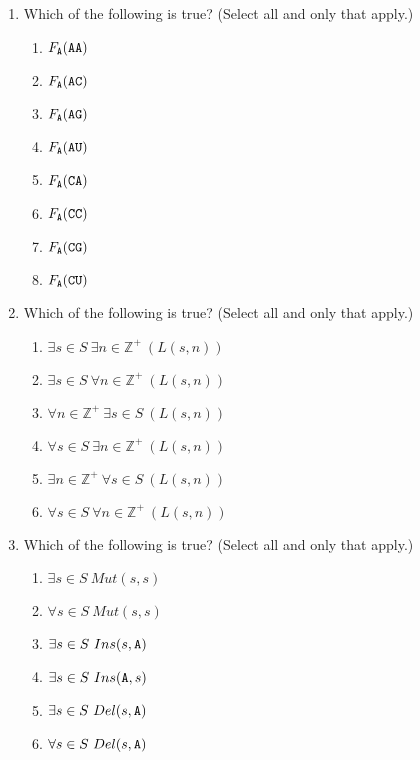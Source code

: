 \documentclass[12pt, oneside]{article}
\begin{document}
\begin{enumerate}
\begin{enumerate}
\item Which of the following is true? (Select  all and only that apply.)
 \begin{enumerate}
    \item $F_{\texttt{A}} ( \texttt{A}\texttt{A})$
    \item $F_{\texttt{A}} ( \texttt{A}\texttt{C})$
    \item $F_{\texttt{A}} ( \texttt{A}\texttt{G})$
    \item $F_{\texttt{A}} ( \texttt{A}\texttt{U})$
    \item $F_{\texttt{A}} ( \texttt{C}\texttt{A})$
    \item $F_{\texttt{A}} ( \texttt{C}\texttt{C})$
    \item $F_{\texttt{A}} ( \texttt{C}\texttt{G})$
    \item $F_{\texttt{A}} ( \texttt{C}\texttt{U})$
 \end{enumerate}    
\item Which of the following is true? (Select  all and only that apply.)
 \begin{enumerate}
    \item $\exists s \in S ~\exists n \in \mathbb{Z}^+ ~(L(s,n))$
    \item $\exists s \in S ~\forall n \in \mathbb{Z}^+ ~(L(s,n))$
    \item $\forall n \in \mathbb{Z}^+~\exists s \in S ~(L(s,n))$
    \item $\forall s \in S ~\exists n \in \mathbb{Z}^+ ~(L(s,n))$
    \item $\exists n \in \mathbb{Z}^+ ~\forall s \in S ~(L(s,n))$
    \item $\forall s \in S ~\forall n \in \mathbb{Z}^+ ~(L(s,n))$
 \end{enumerate} 
\item Which of the following is true? (Select  all and only that apply.)
 \begin{enumerate}
    \item $\exists s \in S ~Mut(s,s)$
    \item $\forall s \in S ~Mut(s,s)$
    \item $\exists s \in S ~Ins(s,\texttt{A})$
    \item $\exists s \in S ~Ins(\texttt{A},s)$
    \item $\exists s \in S ~Del(s,\texttt{A})$
    \item $\forall s \in S ~Del(s,\texttt{A})$
 \end{enumerate} 
\end{enumerate}

\end{enumerate}
\end{document}
